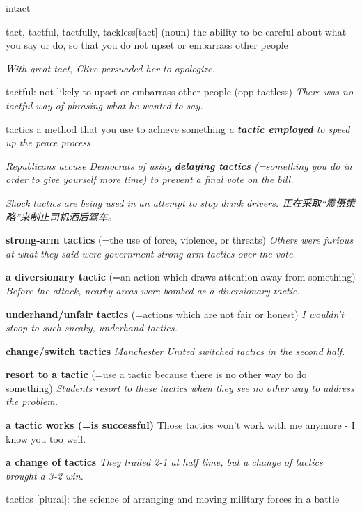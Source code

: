 \begin{DefWord}{intact}
\end{DefWord}

\begin{DefWord}{tact, tactful, tactfully, tackless}[tact]
    (noun) the ability to be careful about what you say or do, so that you do not upset or embarrass other people

    \textit{With great tact, Clive persuaded her to apologize.}

    tactful: not likely to upset or embarrass other people (opp tactless)
    \textit{There was no tactful way of phrasing what he wanted to say.}
\end{DefWord}

\begin{DefWord}{tactics}
    a method that you use to achieve something
    \textit{a \textbf{tactic employed} to speed up the peace process}

    \textit{Republicans accuse Democrats of using \textbf{delaying tactics} (=something you do in order to give yourself more time) to prevent a final vote on the bill.}

    \textit{Shock tactics are being used in an attempt to stop drink drivers. 正在采取“震慑策略”来制止司机酒后驾车。}

    \textbf{strong-arm tactics} (=the use of force, violence, or threats)
    \textit{Others were furious at what they said were government strong-arm tactics over the vote.}

    \textbf{a diversionary tactic} (=an action which draws attention away from something)
    \textit{Before the attack, nearby areas were bombed as a diversionary tactic.}

    \textbf{underhand/unfair tactics} (=actions which are not fair or honest)
    \textit{I wouldn't stoop to such sneaky, underhand tactics.}

    \textbf{change/switch tactics}
    \textit{Manchester United switched tactics in the second half.}

    \textbf{resort to a tactic} (=use a tactic because there is no other way to do something)
    \textit{Students resort to these tactics when they see no other way to address the problem.}

    \textbf{a tactic works (=is successful)}
    Those tactics won’t work with me anymore - I know you too well.

    \textbf{a change of tactics}
    \textit{They trailed 2-1 at half time, but a change of tactics brought a 3-2 win.}

    tactics [plural]: the science of arranging and moving military forces in a battle

\end{DefWord}


